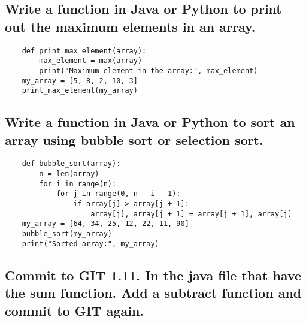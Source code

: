 \documentclass[11pt, letterpaper]{article}
\begin{document}
\subsection{Write a function in Java or Python to print out the maximum elements in an array.}
\begin{verbatim}
    def print_max_element(array):
        max_element = max(array)
        print("Maximum element in the array:", max_element)
    my_array = [5, 8, 2, 10, 3]
    print_max_element(my_array)
\end{verbatim}
\subsection{Write a function in Java or Python to sort an array using bubble sort or selection sort.}
\begin{verbatim}
    def bubble_sort(array):
        n = len(array)
        for i in range(n):
            for j in range(0, n - i - 1):
                if array[j] > array[j + 1]:
                    array[j], array[j + 1] = array[j + 1], array[j]
    my_array = [64, 34, 25, 12, 22, 11, 90]
    bubble_sort(my_array)
    print("Sorted array:", my_array)
\end{verbatim}
\subsection{Commit to GIT 1.11. In the java file that have the sum function. Add a subtract function and commit to GIT again.}
\end{document}
